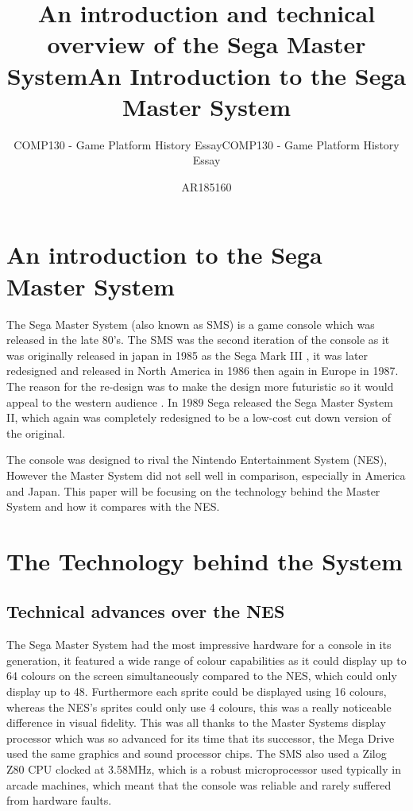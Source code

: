 \documentclass{scrartcl}
\title{An introduction and technical overview of the Sega Master System}
\subtitle{COMP130 - Game Platform History Essay}
\title{An Introduction to the Sega Master System}
\subtitle{COMP130 - Game Platform History Essay}
\author{AR185160}
\begin{document}
\maketitle



\section{An introduction to the Sega Master System}

The Sega Master System (also known as SMS) is a game console which was released in the late 80’s. The SMS was the second iteration of the console as it was originally released in japan in 1985 as the Sega Mark III \cite{Weiss2009}, it was later redesigned and released in North America in 1986 then again in Europe in 1987. The reason for the re-design was to make the design more futuristic so it would appeal to the western audience \cite{parkin}. In 1989 Sega released the Sega Master System II, which again was completely redesigned to be a low-cost cut down version of the original.

The console was designed to rival the Nintendo Entertainment System (NES), However the Master System did not sell well in comparison, especially in America and Japan. \cite{Orland} This paper will be focusing on the technology behind the Master System and how it compares with the NES.

\section{The Technology behind the System}

\subsection{Technical advances over the NES}

The Sega Master System had the most impressive hardware for a console in its generation, it featured a wide range of colour capabilities as it could display up to 64 colours on the screen simultaneously compared to the NES\cite{racket}, which could only display up to 48. Furthermore each sprite could be displayed using 16 colours, whereas the NES's sprites could only use 4 colours\cite{NESsoftwaremanual}, this was a really noticeable difference in visual fidelity. This was all thanks to the Master Systems display processor which was so advanced for its time that its successor, the Mega Drive used the same graphics and sound processor chips. The SMS also used a Zilog Z80 CPU clocked at 3.58MHz\cite{SegaSoftwareManual}, which is a robust microprocessor used typically in arcade machines, which meant that the console was reliable and rarely suffered from hardware faults.\cite{russell} 
\end{document}
